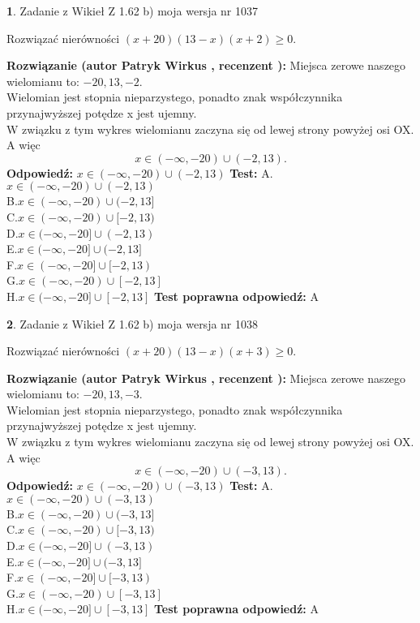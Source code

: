 \documentclass[12pt, a4paper]{article}
\theoremstyle{definition} %
\newtheorem{zad}{}
\newcommand{\zadStart}[1]{\begin{zad}#1\newline}
\newcommand{\zadStop}{\end{zad}}
\newcommand{\rozwStart}[2]{\noindent \textbf{Rozwiązanie (autor #1 , recenzent #2): }\newline}
\newcommand{\rozwStop}{\newline}
\newcommand{\odpStart}{\noindent \textbf{Odpowiedź:}\newline}
\newcommand{\odpStop}{\newline}
\newcommand{\testStart}{\noindent \textbf{Test:}\newline}
\newcommand{\testStop}{\newline}
\newcommand{\kluczStart}{\noindent \textbf{Test poprawna odpowiedź:}\newline}
\newcommand{\kluczStop}{\newline}
\begin{document}
\zadStart{Zadanie z Wikieł Z 1.62 b) moja wersja nr 1037}

Rozwiązać nierówności $(x+20)(13-x)(x+2)\ge0$.
\zadStop
\rozwStart{Patryk Wirkus}{}
Miejsca zerowe naszego wielomianu to: $-20, 13, -2$.\\
Wielomian jest stopnia nieparzystego, ponadto znak współczynnika przy\linebreak najwyższej potędze x jest ujemny.\\ W związku z tym wykres wielomianu zaczyna się od lewej strony powyżej osi OX. A więc $$x \in (-\infty,-20) \cup (-2,13).$$
\rozwStop
\odpStart
$x \in (-\infty,-20) \cup (-2,13)$
\odpStop
\testStart
A.$x \in (-\infty,-20) \cup (-2,13)$\\
B.$x \in (-\infty,-20) \cup (-2,13]$\\
C.$x \in (-\infty,-20) \cup [-2,13)$\\
D.$x \in (-\infty,-20] \cup (-2,13)$\\
E.$x \in (-\infty,-20] \cup (-2,13]$\\
F.$x \in (-\infty,-20] \cup [-2,13)$\\
G.$x \in (-\infty,-20) \cup [-2,13]$\\
H.$x \in (-\infty,-20] \cup [-2,13]$
\testStop
\kluczStart
A
\kluczStop



\zadStart{Zadanie z Wikieł Z 1.62 b) moja wersja nr 1038}

Rozwiązać nierówności $(x+20)(13-x)(x+3)\ge0$.
\zadStop
\rozwStart{Patryk Wirkus}{}
Miejsca zerowe naszego wielomianu to: $-20, 13, -3$.\\
Wielomian jest stopnia nieparzystego, ponadto znak współczynnika przy\linebreak najwyższej potędze x jest ujemny.\\ W związku z tym wykres wielomianu zaczyna się od lewej strony powyżej osi OX. A więc $$x \in (-\infty,-20) \cup (-3,13).$$
\rozwStop
\odpStart
$x \in (-\infty,-20) \cup (-3,13)$
\odpStop
\testStart
A.$x \in (-\infty,-20) \cup (-3,13)$\\
B.$x \in (-\infty,-20) \cup (-3,13]$\\
C.$x \in (-\infty,-20) \cup [-3,13)$\\
D.$x \in (-\infty,-20] \cup (-3,13)$\\
E.$x \in (-\infty,-20] \cup (-3,13]$\\
F.$x \in (-\infty,-20] \cup [-3,13)$\\
G.$x \in (-\infty,-20) \cup [-3,13]$\\
H.$x \in (-\infty,-20] \cup [-3,13]$
\testStop
\kluczStart
A
\kluczStop
\end{document}
